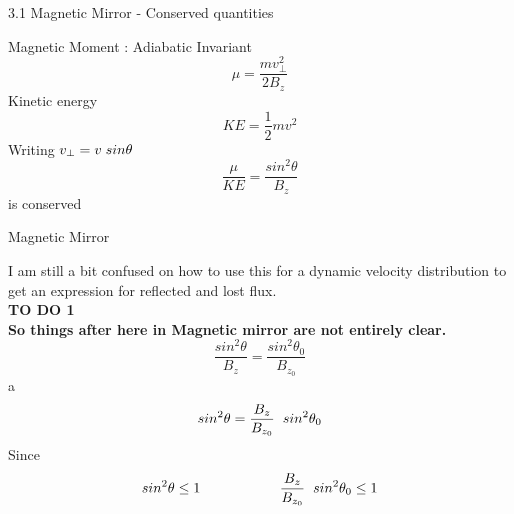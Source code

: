 \documentclass{beamer}
\newcommand{\comment}[1]{}
\begin{document}
	\begin{frame}[t]{3.1 Magnetic Mirror - Conserved quantities}
		\comment{For single particle motion\\
		Assumption for simple case\\
		\begin{itemize}
			\item no electric field
			\item cylindrically symmetric magnetic field
			\item gradient of the magnetic field is only along the axial direction of the cylinder, the $z$ direction
		\end{itemize}}
		Magnetic Moment : Adiabatic Invariant
		$$\mu = \frac{m v_{\perp}^{2}}{2B_{z}} $$
		Kinetic energy
		$$ KE = \frac{1}{2}m v^{2}$$
		Writing  $v_{\perp} = v \hspace{0.1cm}sin \theta$
		$$\frac{\mu}{KE} = \frac{sin^{2}\theta}{B_{z}}$$
		is conserved
	\end{frame}

	\begin{frame}[t]{Magnetic Mirror}
		\comment{Writing  $v_{\perp} = v \hspace{0.1cm}sin \theta$
		$$\frac{\mu}{KE} = \frac{sin^{2}\theta}{B_{z}}$$
		is conserved}
		
		I am still a bit confused on how to use this for a dynamic velocity distribution to get an expression for reflected and lost flux. \\
		\color{blue}
		\textbf{TO DO 1} \\
		\color{red} 
		\textbf{So things after here in Magnetic mirror are not entirely clear.}
		\color{black}\\
		
		$$ \frac{sin^{2}\theta}{B_{z}} = \frac{sin^{2}\theta_{0}}{B_{z_{0}}} $$ 
		a $$ sin^{2}\theta = \frac{B_{z}}{B_{z_{0}}} \hspace{0.2cm} sin^{2}\theta_{0}$$
		Since $$ sin^{2}\theta \leq 1 \hspace{2cm} \frac{B_{z}}{B_{z_{0}}} \hspace{0.2cm} sin^{2}\theta_{0} \leq 1$$
	\end{frame}
\end{document}

